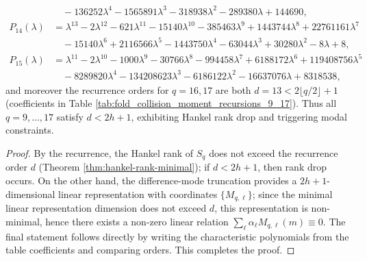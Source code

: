 \begin{theorem}
$$\begin{aligned}
&\quad-136252\lambda^4-1565891\lambda^3-318938\lambda^2-289380\lambda+144690,\\
P_{14}(\lambda)&=\lambda^{13}-2\lambda^{12}-621\lambda^{11}-15140\lambda^{10}-385463\lambda^9+1443744\lambda^8+22761161\lambda^7\\
&\quad-15140\lambda^6+2116566\lambda^5-1443750\lambda^4-63044\lambda^3+30280\lambda^2-8\lambda+8,\\
P_{15}(\lambda)&=\lambda^{11}-2\lambda^{10}-1000\lambda^9-30766\lambda^8-994458\lambda^7+6188172\lambda^6+119408756\lambda^5\\
&\quad-8289820\lambda^4-134208623\lambda^3-6186122\lambda^2-16637076\lambda+8318538,
\end{aligned}
$$
and moreover the recurrence orders for \(q=16,17\) are both \(d=13<2\lfloor q/2\rfloor+1\) (coefficients in Table \ref{tab:fold_collision_moment_recursions_9_17}). Thus all \(q=9,\dots,17\) satisfy \(d<2h+1\), exhibiting Hankel rank drop and triggering modal constraints.
\end{theorem}
\begin{proof}
By the recurrence, the Hankel rank of \(S_q\) does not exceed the recurrence order \(d\) (Theorem \ref{thm:hankel-rank-minimal}); if \(d<2h+1\), then rank drop occurs.
On the other hand, the difference-mode truncation provides a \(2h+1\)-dimensional linear representation with coordinates \(\{M_{q,\ell}\}\); since the minimal linear representation dimension does not exceed \(d\), this representation is non-minimal, hence there exists a non-zero linear relation \(\sum_{\ell}\alpha_\ell M_{q,\ell}(m)\equiv 0\).
The final statement follows directly by writing the characteristic polynomials from the table coefficients and comparing orders. This completes the proof.
\end{proof}



